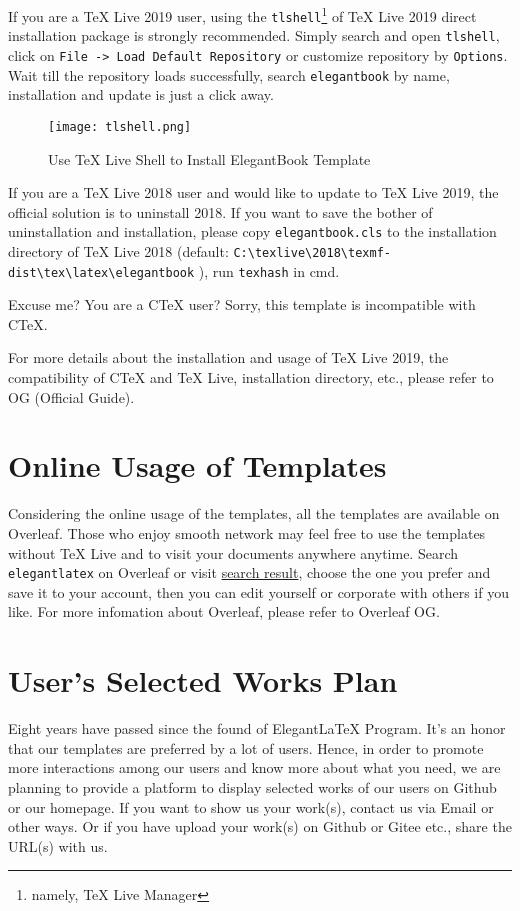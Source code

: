 \documentclass[fancy,blue,11pt]{elegantbook}
\begin{document}
If you are a \TeX{} Live 2019 user, using the \lstinline{tlshell}\footnote{namely, \TeX{} Live Manager} of \TeX{} Live 2019 direct installation package is strongly recommended. Simply search and open \lstinline{tlshell}, click on \lstinline{File -> Load Default Repository} or customize repository by \lstinline{Options}. Wait till the repository loads successfully, search \lstinline{elegantbook} by name, installation and update is just a click away.

\begin{figure}[htbp]
	\centering
	\texttt{[image: tlshell.png]}
	\caption{Use \TeX{} Live Shell to Install ElegantBook Template}
\end{figure}

If you are a \TeX{} Live 2018 user and would like to update to \TeX{} Live 2019, the official solution is to uninstall 2018. If you want to save the bother of uninstallation and installation, please copy \lstinline{elegantbook.cls} to the installation directory of \TeX{} Live 2018 (default: \lstinline|C:\texlive\2018\texmf-dist\tex\latex\elegantbook| ), run \lstinline{texhash} in cmd.

Excuse me? You are a  C\TeX{}  user? Sorry, this template is incompatible with C\TeX{}.

For more details about the installation and usage of \TeX{} Live 2019, the compatibility of C\TeX{} and \TeX{} Live, installation directory, etc., please refer to OG (Official Guide).

\section{Online Usage of Templates}
Considering the online usage of the templates, all the templates are available on Overleaf. Those who enjoy smooth network may feel free to use the templates without \TeX{} Live and to visit your documents anywhere anytime. Search \lstinline{elegantlatex} on Overleaf or visit \href{https://www.overleaf.com/latex/templates?addsearch=elegantlatex}{search result}, choose the one you prefer and save it to your account, then you can edit yourself or corporate with others if you like. For more infomation about Overleaf, please refer to Overleaf OG.

\section{User\rq s Selected Works Plan}
Eight years have passed since the found of Elegant\LaTeX{} Program. It\rq s an honor that our templates are preferred by a lot of users. Hence, in order to promote more interactions among our users and know more about what you need, we are planning to provide a platform to display selected works of our users on Github or our homepage. If you want to show us your work(s), contact us via Email or other ways. Or if you have upload your work(s) on Github or Gitee etc., share the URL(s) with us.
\end{document}

